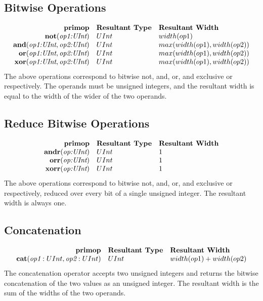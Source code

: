 \documentclass[12pt]{article}
\begin{document}
\subsection{Bitwise Operations}
\[
\begin{array}{rll}
\text{\bf primop} & \text{\bf Resultant Type} & \text{\bf Resultant Width} \\
\text{\bf not}     (\text{\em op1:UInt}) & UInt & width(op1)    \\
\text{\bf and}     (\text{\em op1:UInt}, \text{\em op2:UInt}) & UInt & max(width(op1),width(op2))    \\
\text{\bf or}      (\text{\em op1:UInt}, \text{\em op2:UInt}) & UInt & max(width(op1),width(op2))    \\
\text{\bf xor}     (\text{\em op1:UInt}, \text{\em op2:UInt}) & UInt & max(width(op1),width(op2))    \\
\end{array}
\]
The above operations correspond to bitwise not, and, or, and exclusive or respectively.
The operands must be unsigned integers, and the resultant width is equal to the width of the wider of the two operands. 

\subsection{Reduce Bitwise Operations}
\[
\begin{array}{rll}
\text{\bf primop} & \text{\bf Resultant Type} & \text{\bf Resultant Width} \\
\text{\bf andr}     (\text{\em op:UInt}) & UInt & 1    \\
\text{\bf orr}      (\text{\em op:UInt}) & UInt & 1    \\
\text{\bf xorr}     (\text{\em op:UInt}) & UInt & 1    \\
\end{array}
\]
The above operations correspond to bitwise not, and, or, and exclusive or respectively, reduced over every bit of a single unsigned integer.
The resultant width is always one.

\subsection{Concatenation}
\[
\begin{array}{rll}
\text{\bf primop} & \text{\bf Resultant Type} & \text{\bf Resultant Width} \\
\text{\bf cat}(\text{\em op1}:UInt, \text{\em op2}:UInt)  & UInt & width(op1) + width(op2)    \\
\end{array}
\]
The concatenation operator accepts two unsigned integers and returns the bitwise concatenation of the two values as an unsigned integer.
The resultant width is the sum of the widths of the two operands.
\end{document}
